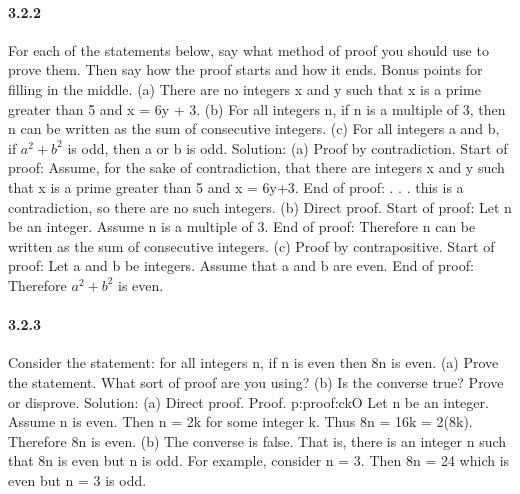 \documentclass{article}
\begin{document}
\paragraph{3.2.2}
For each of the statements below, say what method of proof you should
use to prove them. Then say how the proof starts and how it ends.
Bonus points for filling in the middle.
(a) There are no integers x and y such that x is a prime greater than
5 and x = 6y + 3.
(b) For all integers n, if n is a multiple of 3, then n can be written as
the sum of consecutive integers.
(c) For all integers a and b, if $a^2+b^2$
is odd, then a or b is odd.\newline
Solution:\newline
(a) Proof by contradiction. Start of proof: Assume, for the sake of
contradiction, that there are integers x and y such that x is a prime
greater than 5 and x = 6y+3. End of proof: . . . this is a contradiction,
so there are no such integers.\newline
(b) Direct proof. Start of proof: Let n be an integer. Assume n is a
multiple of 3. End of proof: Therefore n can be written as the sum of
consecutive integers.\newline
(c) Proof by contrapositive. Start of proof: Let a and b be integers.
Assume that a and b are even. End of proof: Therefore $a^2+b^2$
is even.
\paragraph{3.2.3}
Consider the statement: for all integers n, if n is even then 8n is even.\newline
(a) Prove the statement. What sort of proof are you using?\newline
(b) Is the converse true? Prove or disprove.\newline
Solution:\newline
(a) Direct proof.
Proof. p:proof:ckO Let n be an integer. Assume n is even. Then
n = 2k for some integer k. Thus 8n = 16k = 2(8k). Therefore 8n is even.\newline 
(b) The converse is false. That is, there is an integer n such that 8n is
even but n is odd. For example, consider n = 3. Then 8n = 24 which
is even but n = 3 is odd.
\end{document}
